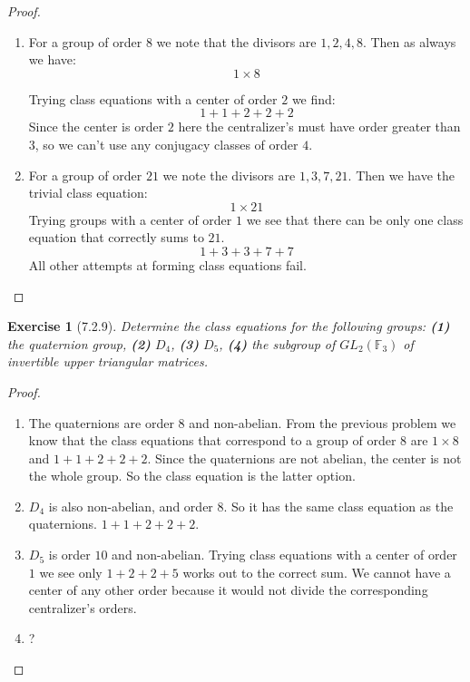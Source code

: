 \documentclass[12pt]{article}
\newtheorem*{exer}{Exercise}
\begin{document}
\begin{proof}
    \begin{enumerate}
        \item For a group of order 8 we note that the divisors are $1,
            2, 4, 8$. Then as always we have:
            \[
                1 \times 8
            \]

            Trying class equations with a center of order $2$ we find:
            \[
                1 + 1 + 2 + 2 + 2
            \]
            Since the center is order $2$ here the centralizer's must
            have order greater than $3$, so we can't use any conjugacy
            classes of order $4$.

        \item For a group of order $21$ we note the divisors are $1, 3,
            7, 21$. Then we have the trivial class equation:
            \[
                1 \times 21
            \]
            Trying groups with a center of order $1$ we see that there
            can be only one class equation that correctly sums to $21$.
            \[
                1 + 3 + 3 + 7 + 7
            \]
            All other attempts at forming class equations fail.
            
    \end{enumerate}

\end{proof}


\begin{exer}[7.2.9]
    Determine the class equations for the following groups: \textbf{(1)}
    the quaternion group, \textbf{(2)} $D_4$, \textbf{(3)} $D_5$,
    \textbf{(4)} the subgroup of $GL_2(\mathbb{F}_3)$ of invertible
    upper triangular matrices.
\end{exer}

\begin{proof}
    \begin{enumerate}
        \item The quaternions are order 8 and non-abelian. From the
            previous problem we know that the class equations that
            correspond to a group of order 8 are $1 \times 8$ and $1 + 1
            + 2 + 2 + 2$. Since the quaternions are not abelian, the
            center is not the whole group. So the class equation is the
            latter option.
        
        \item $D_4$ is also non-abelian, and order 8. So it has the same
            class equation as the quaternions. $1 + 1 + 2 + 2 + 2$.

        \item $D_5$ is order $10$ and non-abelian. Trying class
            equations with a center of order $1$ we see only $1 + 2 + 2
            + 5$ works out to the correct sum. We cannot have a center
            of any other order because it would not divide the
            corresponding centralizer's orders.

        \item ?
    \end{enumerate}

\end{proof}
\end{document}
